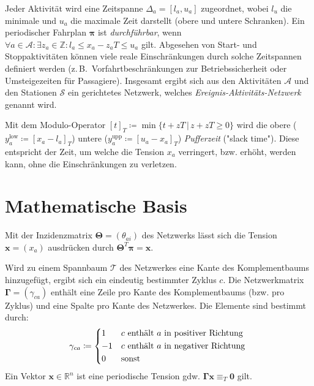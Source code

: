 \documentclass[a4paper, 11pt, twocolumn]{scrartcl}
\newcommand{\R}{\ensuremath{\mathbb{R}}}
\newcommand{\Z}{\ensuremath{\mathbb{Z}}}
\newcommand{\mat}[1]{\boldsymbol{\mathbf{#1}}}
\renewcommand{\vec}[1]{\boldsymbol{\mathbf{#1}}}
\newcommand{\zB}{z.\,B.~}
\begin{document}
		Jeder Aktivität wird eine Zeitspanne \( \Delta_a = [l_a, u_a] \) zugeordnet, wobei \( l_u \) die minimale und \( u_a \) die maximale Zeit darstellt (obere und untere Schranken). Ein periodischer Fahrplan \( \vec{\pi} \) ist \emph{durchführbar}, wenn \( \forall a \in \mathcal{A} : \exists z_a \in \Z : l_a \leq x_a - z_a T \leq u_a \) gilt. Abgesehen von Start- und Stoppaktivitäten können viele reale Einschränkungen durch solche Zeitspannen definiert werden (\zB Vorfahrtbeschränkungen zur Betriebssicherheit oder Umsteigezeiten für Passagiere). Insgesamt ergibt sich aus den Aktivitäten \(\mathcal{A}\) und den Stationen \(\mathcal{S}\) ein gerichtetes Netzwerk, welches \emph{Ereignis-Aktivitäts-Netzwerk} genannt wird.
		
		Mit dem Modulo-Operator \( [t]_T \coloneqq \min \big\{ t + zT \,\vert\, z + zT \geq 0 \big\} \) wird die obere (\( y_a^\text{low} \coloneqq [x_a - l_a]_T \)) untere (\( y_a^\text{upp} \coloneqq [u_a - x_a]_T \)) \emph{Pufferzeit} ("slack time"). Diese entspricht der Zeit, um welche die Tension \(x_a\) verringert, bzw. erhöht, werden kann, ohne die Einschränkungen zu verletzen.
		
	
	\section{Mathematische Basis} 
		Mit der Inzidenzmatrix \( \mat{\Theta} = (\theta_{ai}) \) des Netzwerks lässt sich die Tension \( \vec{x} = (x_a) \) ausdrücken durch \( \mat{\Theta}^T \vec{\pi} = \vec{x} \).
		
		Wird zu einem Spannbaum \(\mathcal{T}\) des Netzwerkes eine Kante des Komplementbaums hinzugefügt, ergibt sich ein eindeutig bestimmter Zyklus \(c\). Die Netzwerkmatrix \( \mat{\Gamma} = (\gamma_{ca}) \) enthält eine Zeile pro Kante des Komplementbaums (bzw. pro Zyklus) und eine Spalte pro Kante des Netzwerkes. Die Elemente sind bestimmt durch:
		\begin{equation*}
			\gamma_{ca} \coloneqq
				\begin{cases*}
					1  & \(c\) enthält \(a\) in positiver Richtung \\
					-1 & \(c\) enthält \(a\) in negativer Richtung \\
					0  & sonst
				\end{cases*}
		\end{equation*}
		Ein Vektor \( \vec{x} \in \R^n \) ist eine periodische Tension gdw. \( \mat{\Gamma} \vec{x} \equiv_T \vec{0} \) gilt.
		
\end{document}
